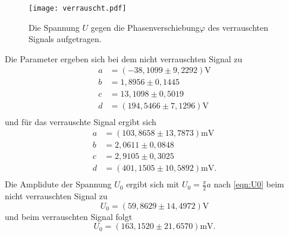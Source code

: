\begin{figure}[H]
  \centering
  \texttt{[image: verrauscht.pdf]}
  \caption{Die Spannung $U$ gegen die Phasenverschiebung$\varphi$ des verrauschten Signals aufgetragen.}
  \label{fig:verrauscht}
\end{figure}
Die Parameter ergeben sich bei dem nicht verrauschten Signal zu
\begin{align*}
  a &= (-38,1099\pm 9,2292)\unit{\volt}\\
  b &= 1,8956\pm 0,1445\\
  c &= 13,1098\pm 0,5019\\
  d &= (194,5466\pm 7,1296)\unit{\volt}\\
\end{align*}
und für das verrauschte Signal ergibt sich
\begin{align*}
  a &= (103,8658\pm 13,7873)\unit{\milli\volt}\\
  b &= 2,0611\pm 0,0848\\
  c &= 2,9105\pm 0,3025\\
  d &= (401,1505\pm 10,5892)\unit{\milli\volt}.\\
\end{align*}
Die Amplidute der Spannung $U_0$ ergibt sich mit $U_0 = \frac{\pi}{2}a$ nach \autoref{eqn:U0} beim nicht verrauschten Signal zu
\begin{equation*}
  U_0 = (59,8629\pm14,4972)\unit{\volt}
\end{equation*}
und beim verrauschten Signal folgt
\begin{equation*}
  U_0 = (163,1520\pm21,6570)\unit{\milli\volt}.
\end{equation*}
